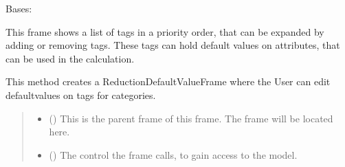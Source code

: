 \documentclass[letterpaper,10pt,english]{sphinxmanual}
\begin{document}
\begin{fulllineitems}
\label{\detokenize{apidoc/src.osm_configurator.view.utilityframes:src.osm_configurator.view.utilityframes.reduction_default_value_frame.ReductionDefaultValueFrame}}
\pysigstartsignatures
{}
\pysigstopsignatures
\sphinxAtStartPar
Bases: 

\sphinxAtStartPar
This frame shows a list of tags in a priority order, that can be expanded by adding or removing tags.
These tags can hold default values on attributes, that can be used in the calculation.

\begin{fulllineitems}
\label{\detokenize{apidoc/src.osm_configurator.view.utilityframes:src.osm_configurator.view.utilityframes.reduction_default_value_frame.ReductionDefaultValueFrame.__init__}}
\pysigstartsignatures
{}
\pysigstopsignatures
\sphinxAtStartPar
This method creates a ReductionDefaultValueFrame where the User can edit default\sphinxhyphen{}values on tags for
categories.
\begin{quote}\begin{description}
\begin{itemize}
\item {} 
\sphinxAtStartPar
{} ({\hyperref[\detokenize{apidoc/src.osm_configurator.view.toplevelframes:src.osm_configurator.view.toplevelframes.reduction_frame.ReductionFrame}]{}}) \textendash{} This is the parent frame of this frame. The frame will be located here.

\item {} 
\sphinxAtStartPar
{} ({\hyperref[\detokenize{apidoc/src.osm_configurator.control:src.osm_configurator.control.control_interface.IControl}]{}}) \textendash{} The control the frame calls, to gain access to the model.


\end{itemize}
\end{description}
\end{quote}
\end{fulllineitems}
\end{fulllineitems}
\end{document}
